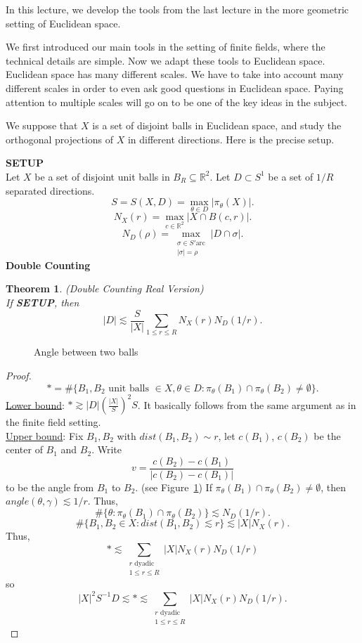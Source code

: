 \documentclass[12pt]{amsart}
\newtheorem{theorem}{Theorem}[section]
\newcommand{\RR}{\mathbb{R}}
\begin{document}
In this lecture,  we develop the tools from the last lecture in the more geometric setting of Euclidean space.   

We first introduced our main tools in the setting of finite fields,  where the technical details are simple.   Now we adapt these tools to Euclidean space.   Euclidean space has many different scales.   We have to take into account many different scales in order to even ask good questions in Euclidean space.   Paying attention to multiple scales will go on to be one of the key ideas in the subject.

We suppose that $X$ is a set of disjoint balls in Euclidean space,  and study the orthogonal projections of $X$ in different directions.   Here is the precise setup.

\newcommand{\R}{\mathbb{R}}

\textbf{SETUP}\\
Let $X$ be a set of disjoint unit balls in $B_R \subseteq \RR^2$. Let $D \subset S^1$ be a set of $1/R$ separated directions. 
$$S=S(X,D)=\max_{\theta \in D}|\pi_\theta(X)|.$$
$$N_X(r)=\max_{c \in \R^2}|X \cap B(c,r)|.$$
$$N_D(\rho)=\max_{\substack{\sigma \in S' \text{arc}\\ |\sigma|=\rho}}|D \cap \sigma|.$$
\textbf{Double Counting}\\
\begin{theorem}(Double Counting Real Version)\label{doubling couting}\\
If \textbf{SETUP}, then
$$|D|\lesssim \frac{S}{|X|}\sum_{1\leq r \leq R}N_X(r)N_D(1/r).$$
\end{theorem}

\begin{figure}[h] 
\centering

\caption{Angle between two balls}
\label{fig:ballanglediagram}
\end{figure}

\begin{proof}
    $$*=\#\{B_1,B_2 \text{ unit balls }\in X, \theta \in D: \pi_\theta(B_1) \cap \pi_\theta(B_2)\not=\emptyset\}.$$
    \underline{Lower bound}: $*\gtrsim |D|\left(\frac{|X|}{S}\right)^2S$. It basically follows from the same argument as in the finite field setting.\\
    \underline{Upper bound}: Fix $B_1,B_2$ with $dist(B_1,B_2)\sim r$, let $c(B_1)$, $c(B_2)$ be the center of $B_1$ and $B_2$. Write 
    $$v=\frac{c(B_2)-c(B_1)}{|c(B_2)-c(B_1)|}$$
    to be the angle from $B_1$ to $B_2$. (see Figure~\ref{fig:ballanglediagram}) If $\pi_\theta(B_1)\cap \pi_\theta(B_2)\not=\emptyset$, then $angle(\theta,\gamma)\lesssim 1/r$.  
    Thus, 
    $$\#\{\theta: \pi_\theta(B_1)\cap \pi_\theta(B_2)\}\lesssim N_D(1/r).$$
    $$\#\{B_1,B_2\in X: dist(B_1,B_2)\lesssim r\}\lesssim |X|N_X(r).$$
    Thus, $$* \lesssim \sum_{\substack{r \text{ dyadic }\\ 1 \leq r \leq R}} |X|N_X(r)N_D(1/r)$$
    so $$|X|^2S^{-1}D\lesssim * \lesssim \sum_{\substack{r \text{ dyadic }\\ 1 \leq r \leq R}}|X|N_X(r)N_D(1/r) .$$
\end{proof}
\end{document}
